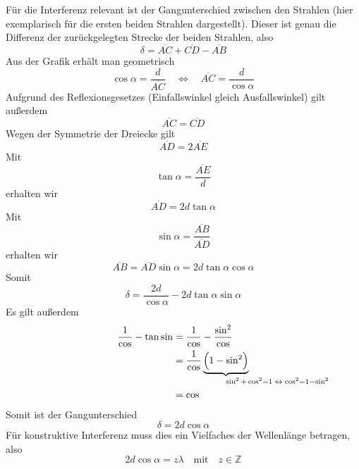 \documentclass[a4paper,german,12pt,smallheadings]{scrartcl}
\begin{document}
Für die Interferenz relevant ist der Gangunterschied zwischen den Strahlen
(hier exemplarisch für die ersten beiden Strahlen dargestellt). Dieser ist
genau die Differenz der zurückgelegten Strecke der beiden Strahlen, also
\begin{equation}
\delta = \overline{AC} + \overline{CD} - \overline{AB}
\end{equation}
Aus der Grafik erhält man geometrisch
\begin{equation}
\cos \alpha = \frac{d}{\overline{AC}} \quad \Leftrightarrow \quad \overline{AC} = \frac{d}{\cos \alpha}
\end{equation}
Aufgrund des Reflexionsgesetzes (Einfallswinkel gleich Ausfallswinkel) gilt
außerdem
\begin{equation}
\overline{AC} = \overline{CD}
\end{equation}
Wegen der Symmetrie der Dreiecke gilt
\begin{equation}
\overline{AD} = 2 \overline{AE}
\end{equation}
Mit
\begin{equation}
\tan \alpha = \frac{\overline{AE}}{d}
\end{equation}
erhalten wir
\begin{equation}
\overline{AD} = 2 d \tan \alpha
\end{equation}
Mit
\begin{equation}
\sin \alpha = \frac{\overline{AB}}{\overline{AD}}
\end{equation}
erhalten wir
\begin{equation}
\overline{AB} = \overline{AD} \sin \alpha = 2d \tan \alpha \cos \alpha
\end{equation}
Somit
\begin{equation}
\delta = \frac{2d}{\cos \alpha} - 2d \tan \alpha \sin \alpha
\end{equation}
Es gilt außerdem
\begin{align*}
\frac{1}{\cos} - \tan \sin &= \frac{1}{\cos} - \frac{\sin^2}{\cos} \\
&= \frac{1}{\cos} \underbrace{\del{1-\sin^2}}_{\mathrlap{\sin^2 + \cos^2 = 1 \; \Leftrightarrow \; \cos^2 = 1 - \sin^2}} \\
&= \cos
\end{align*}
Somit ist der Gangunterschied
\begin{equation}
\delta = 2d \cos \alpha
\end{equation}
Für konstruktive Interferenz muss dies ein Vielfaches der Wellenlänge betragen,
also
\begin{equation}
2d \cos \alpha = z \lambda \quad \text{mit} \quad z \in \mathbb{Z}
\end{equation}
\end{document}
